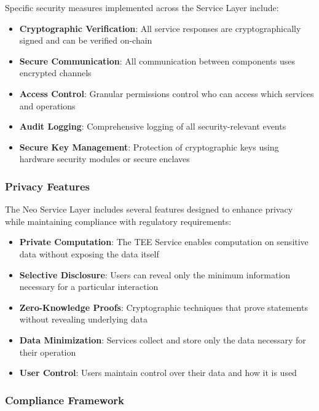 Specific security measures implemented across the Service Layer include:

\begin{itemize}
    \item \textbf{Cryptographic Verification}: All service responses are cryptographically signed and can be verified on-chain
    \item \textbf{Secure Communication}: All communication between components uses encrypted channels
    \item \textbf{Access Control}: Granular permissions control who can access which services and operations
    \item \textbf{Audit Logging}: Comprehensive logging of all security-relevant events
    \item \textbf{Secure Key Management}: Protection of cryptographic keys using hardware security modules or secure enclaves
\end{itemize}

\subsubsection{Privacy Features}
\label{subsubsec:privacy-features}

The Neo Service Layer includes several features designed to enhance privacy while maintaining compliance with regulatory requirements:

\begin{itemize}
    \item \textbf{Private Computation}: The TEE Service enables computation on sensitive data without exposing the data itself
    \item \textbf{Selective Disclosure}: Users can reveal only the minimum information necessary for a particular interaction
    \item \textbf{Zero-Knowledge Proofs}: Cryptographic techniques that prove statements without revealing underlying data
    \item \textbf{Data Minimization}: Services collect and store only the data necessary for their operation
    \item \textbf{User Control}: Users maintain control over their data and how it is used
\end{itemize}

\subsubsection{Compliance Framework}
\label{subsubsec:compliance-framework}


